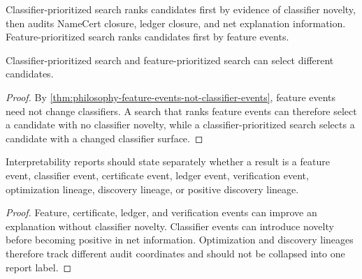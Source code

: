 \begin{definition}
\label{def:philosophy-classifier-prioritized-search}
Classifier-prioritized search ranks candidates first by evidence of
classifier novelty, then audits NameCert closure, ledger closure, and
net explanation information. Feature-prioritized search ranks candidates
first by feature events.
\end{definition}

\begin{theorem}
\label{thm:philosophy-classifier-prioritized-differs-feature-prioritized}
Classifier-prioritized search and feature-prioritized search can select
different candidates.
\end{theorem}
\begin{proof}
By
\autoref{thm:philosophy-feature-events-not-classifier-events}, feature
events need not change classifiers. A search that ranks feature events
can therefore select a candidate with no classifier novelty, while a
classifier-prioritized search selects a candidate with a changed
classifier surface.
\end{proof}

\begin{theorem}
\label{thm:philosophy-classifier-novelty-practice-audit-theorem}
Interpretability reports should state separately whether a result is a
feature event, classifier event, certificate event, ledger event,
verification event, optimization lineage, discovery lineage, or positive
discovery lineage.
\end{theorem}
\begin{proof}
Feature, certificate, ledger, and verification events can improve an
explanation without classifier novelty. Classifier events can introduce
novelty before becoming positive in net information. Optimization and
discovery lineages therefore track different audit coordinates and
should not be collapsed into one report label.
\end{proof}

